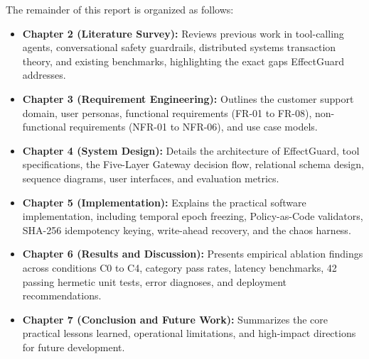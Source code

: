 The remainder of this report is organized as follows:
\begin{itemize}
    \item \textbf{Chapter 2 (Literature Survey):} Reviews previous work in tool-calling agents, conversational safety guardrails, distributed systems transaction theory, and existing benchmarks, highlighting the exact gaps EffectGuard addresses.
    \item \textbf{Chapter 3 (Requirement Engineering):} Outlines the customer support domain, user personas, functional requirements (FR-01 to FR-08), non-functional requirements (NFR-01 to NFR-06), and use case models.
    \item \textbf{Chapter 4 (System Design):} Details the architecture of EffectGuard, tool specifications, the Five-Layer Gateway decision flow, relational schema design, sequence diagrams, user interfaces, and evaluation metrics.
    \item \textbf{Chapter 5 (Implementation):} Explains the practical software implementation, including temporal epoch freezing, Policy-as-Code validators, SHA-256 idempotency keying, write-ahead recovery, and the chaos harness.
    \item \textbf{Chapter 6 (Results and Discussion):} Presents empirical ablation findings across conditions C0 to C4, category pass rates, latency benchmarks, 42 passing hermetic unit tests, error diagnoses, and deployment recommendations.
    \item \textbf{Chapter 7 (Conclusion and Future Work):} Summarizes the core practical lessons learned, operational limitations, and high-impact directions for future development.
\end{itemize}
